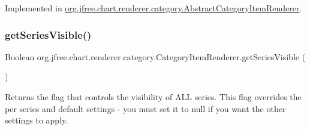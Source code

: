 Implemented in \mbox{\hyperlink{classorg_1_1jfree_1_1chart_1_1renderer_1_1category_1_1_abstract_category_item_renderer_aacaf1b8c18bb07c8394b00a416f276ba}{org.\+jfree.\+chart.\+renderer.\+category.\+Abstract\+Category\+Item\+Renderer}}.

\mbox{\label{interfaceorg_1_1jfree_1_1chart_1_1renderer_1_1category_1_1_category_item_renderer_a0769a384dfe60163122348120d334ccf}} 
\subsubsection{\texorpdfstring{get\+Series\+Visible()}{getSeriesVisible()}\hspace{0.1cm}{\footnotesize\ttfamily [1/2]}}
{\footnotesize\ttfamily Boolean org.\+jfree.\+chart.\+renderer.\+category.\+Category\+Item\+Renderer.\+get\+Series\+Visible (\begin{DoxyParamCaption}{ }\end{DoxyParamCaption})}

Returns the flag that controls the visibility of A\+LL series. This flag overrides the per series and default settings -\/ you must set it to {\ttfamily null} if you want the other settings to apply.

